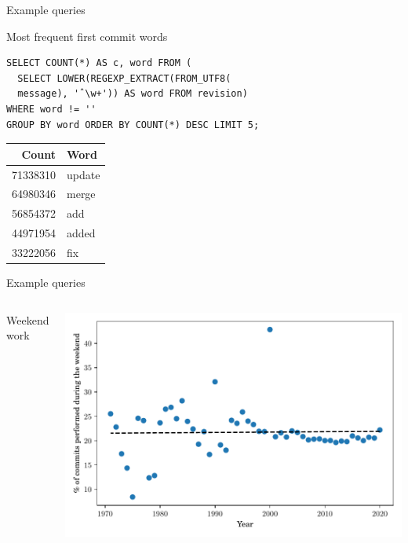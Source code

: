 \documentclass[aspectratio=169,xcolor=table]{beamer}
\begin{document}
    \begin{frame}[fragile]{Example queries}
        \begin{block}{Most frequent first commit words}
            \begin{verbatim}
SELECT COUNT(*) AS c, word FROM (
  SELECT LOWER(REGEXP_EXTRACT(FROM_UTF8(
  message), 'ˆ\w+')) AS word FROM revision)
WHERE word != ''
GROUP BY word ORDER BY COUNT(*) DESC LIMIT 5;
            \end{verbatim}

            \begin{center}
                \begin{tabular}{rl}
                    Count & Word\\
                    \hline
                    \num{71338310} & update\\
                    \num{64980346} & merge\\
                    \num{56854372} & add\\
                    \num{44971954} & added\\
                    \num{33222056} & fix\\
                \end{tabular}
            \end{center}
        \end{block}
    \end{frame}

    \begin{frame}[fragile]{Example queries}
        \begin{columns}
            \begin{block}{Weekend work}
                \inputminted[fontsize=\tiny, firstline=3]{sql}{../codesamples/graph-dataset/weekend-work.sql}
            \end{block}
            \begin{center}
                \includegraphics[width=\linewidth]{../img/graph-dataset/weekend-work}
            \end{center}
        \end{columns}
    \end{frame}
\end{document}
